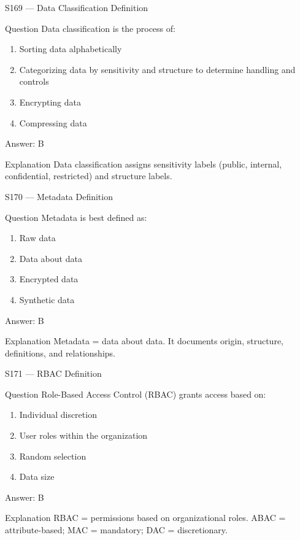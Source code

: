 \documentclass[aspectratio=169,8pt]{beamer}
\begin{document}
	\begin{frame}{S169 --- Data Classification Definition}
		\begin{block}{Question}
			Data classification is the process of:
			\begin{enumerate}
				\item Sorting data alphabetically
				\item Categorizing data by sensitivity and structure to determine handling and controls
				\item Encrypting data
				\item Compressing data
			\end{enumerate}
		\end{block}
		\begin{exampleblock}{Answer: B}\end{exampleblock}
		\begin{block}{Explanation}
			Data classification assigns sensitivity labels (public, internal, confidential, restricted) and structure labels.
		\end{block}
	\end{frame}
	
	\begin{frame}{S170 --- Metadata Definition}
		\begin{block}{Question}
			Metadata is best defined as:
			\begin{enumerate}
				\item Raw data
				\item Data about data
				\item Encrypted data
				\item Synthetic data
			\end{enumerate}
		\end{block}
		\begin{exampleblock}{Answer: B}\end{exampleblock}
		\begin{block}{Explanation}
			Metadata = data about data. It documents origin, structure, definitions, and relationships.
		\end{block}
	\end{frame}
	
	\begin{frame}{S171 --- RBAC Definition}
		\begin{block}{Question}
			Role-Based Access Control (RBAC) grants access based on:
			\begin{enumerate}
				\item Individual discretion
				\item User roles within the organization
				\item Random selection
				\item Data size
			\end{enumerate}
		\end{block}
		\begin{exampleblock}{Answer: B}\end{exampleblock}
		\begin{block}{Explanation}
			RBAC = permissions based on organizational roles. ABAC = attribute-based; MAC = mandatory; DAC = discretionary.
		\end{block}
	\end{frame}
	
\end{document}
